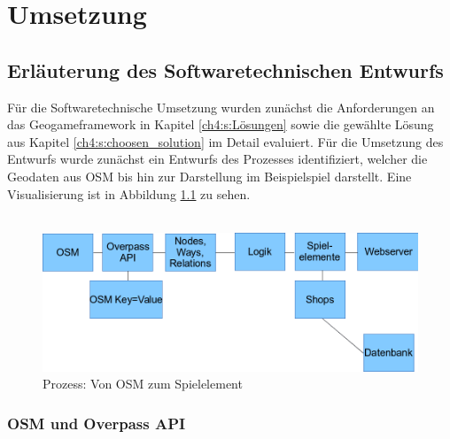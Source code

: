 \chapter{Umsetzung}
\label{ch:S5_Umsetzung}

\section{Erläuterung des Softwaretechnischen Entwurfs}
\label{ch5:s:Entwurf}

Für die Softwaretechnische Umsetzung wurden zunächst die Anforderungen an das Geogameframework in Kapitel \ref{ch4:s:Lösungen} sowie die gewählte Lösung aus Kapitel \ref{ch4:s:choosen_solution} im Detail evaluiert. Für die Umsetzung des Entwurfs wurde zunächst ein Entwurfs des Prozesses identifiziert, welcher die Geodaten aus OSM bis hin zur Darstellung im Beispielspiel darstellt. Eine Visualisierung ist in Abbildung \ref{img:ch5_img01_framework_progress} zu sehen.
\\\\

\begin{figure}[H]
\begin{center}
\includegraphics[width=140mm]{images/ch5_img01_framework_progress.png}
\caption{Prozess: Von OSM zum Spielelement}
\label{img:ch5_img01_framework_progress}
\end{center}
\end{figure}

\subsection*{OSM und Overpass API}

